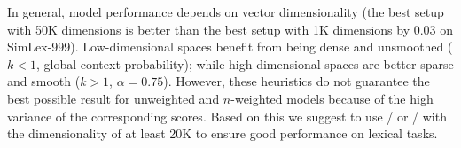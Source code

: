 \documentclass[11pt]{article}
\begin{document}
In general, model performance depends on vector dimensionality (the best setup with 50K dimensions is better than the best setup with 1K dimensions by 0.03 on SimLex-999). Low-dimensional spaces benefit from being dense and unsmoothed  ($k < 1$, global context probability); while high-dimensional spaces are better sparse and smooth  ($k > 1$, $\alpha = 0.75$). However, these heuristics do not guarantee the best possible result for unweighted and $n$-weighted models because of the high variance of the corresponding scores. Based on this we suggest to use \logNSPMI/ or \logNSCPMI/ with the dimensionality of at least 20K to ensure good performance on lexical tasks.

%
% 

\balance

\end{document}
